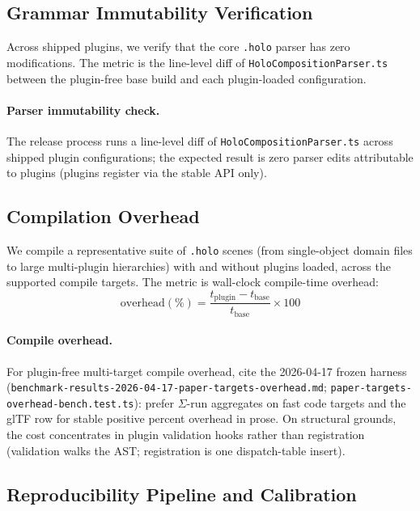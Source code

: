 \documentclass[sigconf,nonacm]{acmart}
\newcommand{\holo}{\texttt{.holo}}
\begin{document}
\subsection{Grammar Immutability Verification}
Across shipped plugins, we verify that the core \holo{}
parser has zero modifications. The metric is the line-level
diff of \texttt{HoloCompositionParser.ts} between the
plugin-free base build and each plugin-loaded configuration.

\paragraph{Parser immutability check.}
The release process runs a line-level diff of
\texttt{HoloCompositionParser.ts} across shipped plugin
configurations; the expected result is zero parser edits
attributable to plugins (plugins register via the stable API only).

\subsection{Compilation Overhead}
We compile a representative suite of \holo{} scenes (from single-object domain files to large multi-plugin hierarchies)
with and without plugins loaded, across the supported compile
targets. The metric is wall-clock compile-time overhead:
$$\text{overhead}(\%) = \frac{t_{\text{plugin}}
  - t_{\text{base}}}{t_{\text{base}}} \times 100$$

\paragraph{Compile overhead.}
For plugin-free multi-target compile overhead, cite the 2026-04-17 frozen
harness (\texttt{benchmark-results-2026-04-17-paper-targets-overhead.md};
\texttt{paper-targets-overhead-bench.test.ts}): prefer $\Sigma$-run aggregates
on fast code targets and the glTF row for stable positive percent overhead in prose.
On structural grounds, the cost
concentrates in plugin validation hooks rather than registration
(validation walks the AST; registration is one dispatch-table insert).

\subsection{Reproducibility Pipeline and Calibration}
\label{sec:paper12-repro-pipeline}
\end{document}
